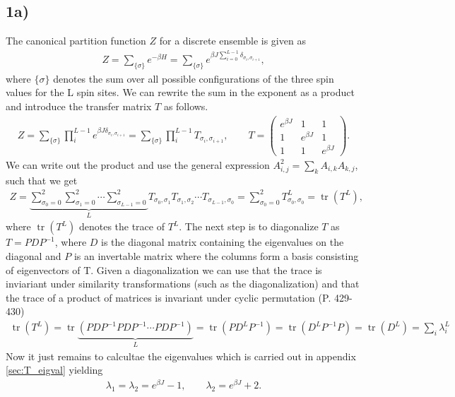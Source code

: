\documentclass[reprint, amsmath, amssymb, aps, onecolumn]{revtex4-2}
\DeclareMathOperator{\tr}{tr}
\begin{document}
\subsection*{1a)}
\noindent The canonical partition function $Z$ for a discrete ensemble is given as
\begin{align*}
  Z = \sum_{\{\sigma \}} e^{-\beta H} 
    = \sum_{\{\sigma \}} e^{\beta J \sum_{i=0}^{L-1} \delta_{\sigma_i, \sigma_{i+1}}}, 
\end{align*}
where $\{\sigma\}$ denotes the sum over all possible configurations of the three spin values for the L spin sites. We can rewrite the sum in the exponent as a product and introduce the transfer matrix $T$ as follows.
\begin{align*}
  Z = \sum_{\{\sigma \}} \prod_i^{L-1}  e^{\beta J \delta_{\sigma_i, \sigma_{i+1}}} 
    = \sum_{\{\sigma \}} \prod_i^{L-1} T_{\sigma_i, \sigma_{i+1}}, \qquad   
    T = \begin{pmatrix}
      e^{\beta J} & 1 & 1 \\
      1 & e^{\beta J} & 1 \\
      1 & 1 & e^{\beta J}
    \end{pmatrix}.
\end{align*}
We can write out the product and use the general expression $A^2_{i,j} = \sum_{k} A_{i,k}A_{k,j}$, such that we get
\begin{align*}
  Z = \underbrace{\sum_{\sigma_0=0}^2 \sum_{\sigma_1=0}^2 \cdots \sum_{\sigma_{L-1}=0}^2}_{L} T_{\sigma_0, \sigma_1} T_{\sigma_1, \sigma_2} \cdots T_{\sigma_{L-1}, \sigma_{0}} = \sum_{\sigma_0=0}^2 T_{\sigma_0, \sigma_0}^{L} = \tr(T^L),
\end{align*}
where $\tr(T^L)$ denotes the trace of $T^L$. The next step is to diagonalize $T$ as $T = PDP^{-1}$, where $D$ is the diagonal matrix containing the eigenvalues on the diagonal and $P$ is an invertable matrix where the columns form a basis consisting of eigenvectors of T. Given a diagonalization we can use that the trace is inviariant under similarity transformations (such as the diagonalization) and that the trace of a product of matrices is invariant under cyclic permutation \cite{Svendsen}(P. 429-430)
\begin{align*}
  \tr(T^L) = \tr\underbrace{(PDP^{-1}PDP^{-1}\cdots PDP^{-1})}_{L} = \tr(PD^LP^{-1}) = \tr(D^LP^{-1}P) = \tr(D^L) = \sum_i \lambda_i^L
\end{align*}
Now it just remains to calcultae the eigenvalues which is carried out in appendix \ref{sec:T_eigval} yielding 
\begin{align*}
  \lambda_1 = \lambda_2 = e^{\beta J} - 1, \qquad \lambda_2 = e^{\beta J} + 2.
\end{align*}
\end{document}
